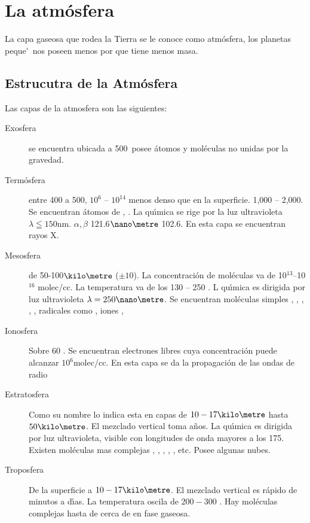 \chapter{La atm\'osfera}
 
 La capa gaseosa que rodea la Tierra se le conoce como atm\'osfera, los planetas peque\'~nos poseen menos por que tiene menos masa.
 \section{Estrucutra de la Atm\'osfera}
 Las capas de la atmosfera son las siguientes:
 \begin{description}
\item[Exosfera ] se encuentra ubicada a 500\kilo\metre\, posee \'atomos y mol\'eculas no unidas por la gravedad.
\item[Term\'osfera] entre 400 a 500\kilo\metre, $10^6$ -- $10^{14}$ menos denso que en la superficie. 1,000 -- 2,000\kelvin. Se encuentran \'atomos de , . La qu\'{\i}mica se rige por la luz ultravioleta $\lambda\leqq 150$nm. $\alpha,\beta$ 121.6$\nano\metre$ 102.6\nano\metre. En esta capa se encuentran  rayos X.
\item[Mesosfera] de 50-100$\kilo\metre$  ($\pm10$). La concentraci\'on de mol\'eculas va de 10$^{13}$--10$^{16}$ molec/cc. La temperatura va de los 130 -- 250 \kelvin. L qu\'{\i}mica es dirigida por luz ultravioleta $\lambda=250\nano\metre$. Se encuentran mol\'eculas simples , , , , , radicales como ,  iones ,
\item[Ionosfera]Sobre 60 \kilo\metre. Se encuentran electrones libres cuya concentraci\'on puede alcanzar $10^6$molec/cc. En esta capa se da la propagaci\'on de las ondas de radio
\item[Estratosfera] Como su nombre lo indica esta en capas de $10-17 \kilo\metre$ hasta $50\kilo\metre$. El mezclado vertical toma a\~nos. La qu\'{\i}mica es dirigida por luz ultravioleta, visible con longitudes de onda mayores a los 175\nano\metre. Existen mol\'eculas mas complejas , , , , , etc. Posee algunas nubes.
\item[Troposfera] De la superficie a $10-17\kilo\metre$. El mezclado vertical es r\'apido de minutos a d\'{\i}as. La temperatura oscila de $200-300$  \kelvin. Hay mol\'eculas complejas hasta de cerca de  en fase gaseosa.
\end{description}


